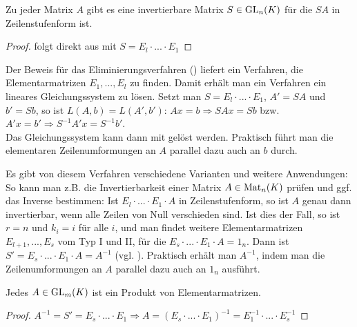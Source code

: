 \begin{conclusion}
	Zu jeder Matrix $A$ gibt es eine invertierbare Matrix $S\in \operatorname{GL}_n(K)$ für die $SA$ in Zeilenstufenform ist.
\end{conclusion}
\begin{proof}
	folgt direkt aus  mit $S=E_l\cdot ... \cdot E_1$
\end{proof}

\begin{remark}
	Der Beweis für das Eliminierungsverfahren () liefert ein Verfahren, die Elementarmatrizen $E_1,...,E_l$ zu finden. 
	Damit erhält man ein Verfahren ein lineares Gleichungssystem zu lösen. Setzt man $S=E_l\cdot ... \cdot E_1$, $A'=SA$ und $b'=Sb$, so 
	ist $L(A,b)=L(A',b')$: $Ax=b\Rightarrow SAx=Sb$ bzw. $A'x=b' \Rightarrow S^{-1}A'x=S^{-1}b'$. \\
	Das Gleichungssystem kann dann mit  gelöst werden. Praktisch führt man die elementaren Zeilenumformungen an $A$ parallel dazu auch an $b$ 
	durch.
\end{remark}

\begin{remark}
	Es gibt von diesem Verfahren verschiedene Varianten und weitere Anwendungen: So kann man z.B. die Invertierbarkeit 
	einer Matrix $A\in \operatorname{Mat}_n(K)$ prüfen und ggf. das Inverse bestimmen: Ist $E_l\cdot ... \cdot E_1\cdot A$ in Zeilenstufenform, so ist $A$ 
	genau dann invertierbar, wenn alle Zeilen von Null verschieden sind. Ist dies der Fall, so ist $r=n$ und $k_i=i$ für alle $i$, 
	und man findet weitere Elementarmatrizen $E_{l+1},...,E_s$ vom Typ I und II, für die $E_s\cdot ... \cdot E_1\cdot A=1_n$. Dann ist 
	$S'=E_s\cdot ... \cdot E_1\cdot A=A^{-1}$ (vgl. ). Praktisch erhält man $A^{-1}$, indem man die Zeilenumformungen an $A$ parallel dazu 
	auch an $1_n$ ausführt.
\end{remark}

\begin{conclusion}
	Jedes $A\in \operatorname{GL}_m(K)$ ist ein Produkt von Elementarmatrizen.
\end{conclusion}
\begin{proof}
	$A^{-1}=S'=E_s\cdot ... \cdot E_1 \Rightarrow A=(E_s\cdot ... \cdot E_1)^{-1}=E_1^{-1}\cdot ... \cdot E_s^{-1}$
\end{proof}